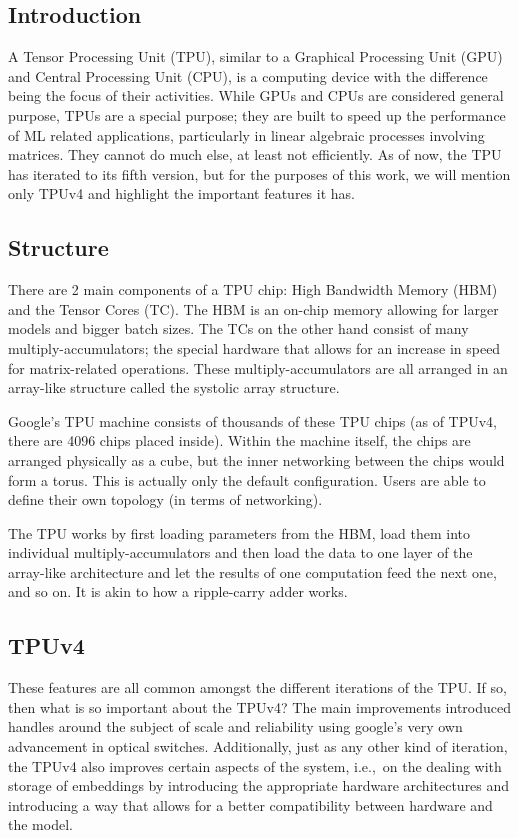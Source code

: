 \subsection{Introduction}
\label{subsec:introduction2}
A Tensor Processing Unit (TPU), similar to a Graphical Processing Unit (GPU) and Central Processing Unit (CPU), is a computing device with the difference being the focus of their activities.
While GPUs and CPUs are considered general purpose, TPUs are a special purpose; they are built to speed up the performance of ML related applications, particularly in linear algebraic processes involving matrices.
They cannot do much else, at least not efficiently.
As of now, the TPU has iterated to its fifth version, but for the purposes of this work, we will mention only TPUv4 and highlight the important features it has.

\subsection{Structure}
\label{subsec:structure}
There are 2 main components of a TPU chip: High Bandwidth Memory (HBM) and the Tensor Cores (TC).
The HBM is an on-chip memory allowing for larger models and bigger batch sizes.
The TCs on the other hand consist of many multiply-accumulators; the special hardware that allows for an increase in speed for matrix-related operations.
These multiply-accumulators are all arranged in an array-like structure called the systolic array structure.

Google’s TPU machine consists of thousands of these TPU chips (as of TPUv4, there are 4096 chips placed inside).
Within the machine itself, the chips are arranged physically as a cube, but the inner networking between the chips would form a torus.
This is actually only the default configuration.
Users are able to define their own topology (in terms of networking).

The TPU works by first loading parameters from the HBM, load them into individual multiply-accumulators and then load the data to one layer of the array-like architecture and let the results of one computation feed the next one, and so on.
It is akin to how a ripple-carry adder works.

\subsection{TPUv4}
\label{subsec:tpuv4}
These features are all common amongst the different iterations of the TPU\@.
If so, then what is so important about the TPUv4?
The main improvements introduced handles around the subject of scale and reliability using google's very own advancement in optical switches.
Additionally, just as any other kind of iteration, the TPUv4 also improves certain aspects of the system, i.e.,\ on the dealing with storage of embeddings by introducing the appropriate hardware architectures and introducing a way that allows for a better compatibility between hardware and the model.

